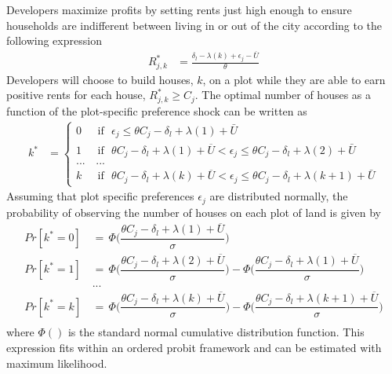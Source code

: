 \documentclass[12pt]{article}
\begin{document}
Developers maximize profits by setting rents just high enough to ensure households are indifferent between living in or out of the city according to the following expression
\begin{align*}
R_{j,k}^{*} &= \frac{ \delta_{l} - \lambda(k) + \epsilon_j - \overline{U}}{\theta}
\end{align*}
Developers will choose to build houses, $k$, on a plot while they are able to earn positive rents for each house, $R^{*}_{j,k}\geq C_j$.  The optimal number of houses as a function of the plot-specific preference shock can be written as 
\begin{align*}
k^{*} &=
\begin{cases}
0 &\text{ if }\,\, \epsilon_j \leq \theta C_{j} - \delta_{l} + \lambda(1) + \bar{U} \\
1 &\text{ if }\,\,  \theta C_{j} - \delta_{l} + \lambda(1) + \overline{U} < \epsilon_j \leq \theta C_{j} - \delta_{l} + \lambda(2) + \bar{U} \\
... & \, ... \\
k &\text{ if }\,\,  \theta C_{j} - \delta_{l} + \lambda(k) + \overline{U} < \epsilon_j \leq \theta C_{j} - \delta_{l} + \lambda(k+1) + \bar{U}
\end{cases}
\end{align*}
Assuming that plot specific preferences $\epsilon_j$ are distributed normally, the probability of observing the number of houses on each plot of land is given by
\begin{align*}
Pr[ k^{*} =0 ] \, &= \, \Phi\Bigg(\dfrac{\theta C_{j} - \delta_{l} + \lambda(1) + \overline{U}}{\sigma}\Bigg) \\
Pr[ k^{*} =1 ] \, &= \, \Phi\Bigg(\dfrac{\theta C_{j} - \delta_{l} + \lambda(2) + \overline{U}}{\sigma}\Bigg) - \Phi\Bigg(\dfrac{\theta C_{j} - \delta_{l} + \lambda(1) + \overline{U}}{\sigma}\Bigg) \\
&... \\
Pr[ k^{*} =k ] \, &= \, \Phi\Bigg(\dfrac{\theta C_{j} - \delta_{l} + \lambda(k) + \overline{U}}{\sigma}\Bigg) - \Phi\Bigg(\dfrac{\theta C_{j} - \delta_{l} + \lambda(k+1) + \overline{U}}{\sigma}\Bigg) \\
\end{align*}
where $\Phi()$ is the standard normal cumulative distribution function.  This expression fits within an ordered probit framework and can be estimated with maximum likelihood.
\end{document}
